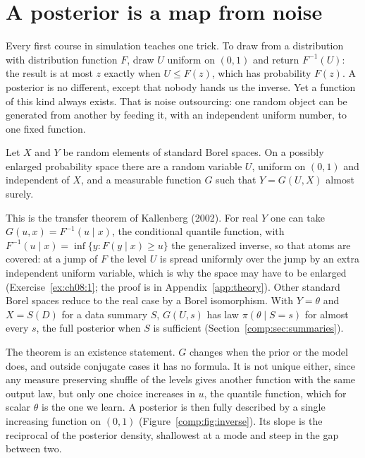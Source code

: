 \section{A posterior is a map from noise}\label{comp:sec:noise}

Every first course in simulation teaches one trick. To draw from a distribution with distribution function $F$, draw $U$ uniform on $(0,1)$ and return $F^{-1}(U)$: the result is at most $z$ exactly when $U\le F(z)$, which has probability $F(z)$. A posterior is no different, except that nobody hands us the inverse. Yet a function of this kind always exists. That is noise outsourcing: one random object can be generated from another by feeding it, with an independent uniform number, to one fixed function.

\begin{theorem}\label{comp:thm:outsourcing}
Let $X$ and $Y$ be random elements of standard Borel spaces. On a possibly enlarged probability space there are a random variable $U$, uniform on $(0,1)$ and independent of $X$, and a measurable function $G$ such that $Y = G(U,X)$ almost surely.
\end{theorem}

This is the transfer theorem of Kallenberg (2002). For real $Y$ one can take $G(u,x)=F^{-1}(u\mid x)$, the conditional quantile function, with $F^{-1}(u\mid x)=\inf\{y:F(y\mid x)\ge u\}$ the generalized inverse, so that atoms are covered: at a jump of $F$ the level $U$ is spread uniformly over the jump by an extra independent uniform variable, which is why the space may have to be enlarged (Exercise~\ref{ex:ch08:1}; the proof is in Appendix~\ref{app:theory}). Other standard Borel spaces reduce to the real case by a Borel isomorphism. With $Y=\theta$ and $X=S(D)$ for a data summary $S$, $G(U,s)$ has law $\pi(\theta\mid S=s)$ for almost every $s$, the full posterior when $S$ is sufficient (Section~\ref{comp:sec:summaries}).

The theorem is an existence statement. $G$ changes when the prior or the model does, and outside conjugate cases it has no formula. It is not unique either, since any measure preserving shuffle of the levels gives another function with the same output law, but only one choice increases in $u$, the quantile function, which for scalar $\theta$ is the one we learn. A posterior is then fully described by a single increasing function on $(0,1)$ (Figure~\ref{comp:fig:inverse}). Its slope is the reciprocal of the posterior density, shallowest at a mode and steep in the gap between two.

